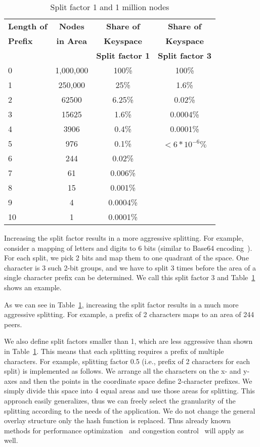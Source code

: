 \documentclass[fleqn,12pt,twoside]{article}
\begin{document}
\begin{table}[!tb]
  \centering
  \begin{tabular}{|l|c|c|c|}
    \hline
    \textbf{Length of}	& \textbf{Nodes} 	 & \textbf{Share of}	& \textbf{Share of}	\\	
    \textbf{Prefix}	& \textbf{in Area} 	 & \textbf{Keyspace}    & \textbf{Keyspace}\\
    		   	&		      	 & \textbf{Split factor 1} &\textbf{Split factor 3}\\
    \hline
    0 & 1,000,000 & 100\%	&100\%\\
    1 & 250,000	  & 25\%	&1.6\%\\
    2 & 62500	  & 6.25\%	&0.02\%\\
    3 & 15625 	  & 1.6\%	&0.0004\%\\
    4 & 3906	  & 0.4\%       &0.0001\%\\ 
    5 &	976	  & 0.1\%	&$<6*10^{-6}\%$\\
    6 &	244	  & 0.02\%&\\
    7 &	61	  & 0.006\%&\\
    8 &	15        & 0.001\%&\\
    9 &	4	  & 0.0004\%&\\
    10&	1	  & 0.0001\%&\\
    \hline
  \end{tabular}
  \caption{Split factor 1 and 1 million nodes}
  \label{tab:quad-tree-f1}
  \vskip -3mm
\end{table}

Increasing the split factor results in a more aggressive splitting.
For example, consider a mapping of letters and digits to 6 bits
(similar to Base64 encoding~\cite{RFC2045}). For each split, we pick 2
bits and map them to one quadrant of the space. One character is 3
such 2-bit groups, and we have to split 3 times before the area of a
single character prefix can be determined. We call this split 
factor 3 and Table~\ref{tab:quad-tree-f1} shows an example.




As we can see in Table~\ref{tab:quad-tree-f1}, increasing the split
factor results in a much more aggressive splitting. For example, a
prefix of 2 characters maps to an area of 244 peers.

We also define split factors smaller than 1, which are less
aggressive than shown in Table~\ref{tab:quad-tree-f1}. This means that
each splitting requires a prefix of multiple characters. For example,
splitting factor 0.5 (i.e., prefix of 2 characters for each split) is
implemented as follows. We arrange all the characters on the x- and
y-axes and then the points in the coordinate space define 2-character
prefixes. We simply divide this space into 4 equal areas and use those
areas for splitting. This approach easily generalizes, thus we can
freely select the granularity of the splitting according to the needs
of the application. We do not change the general overlay structure only the hash function is replaced. 
Thus already known methods for performance optimization~\cite{dabek2004ddl} and 
congestion control~\cite{klemm2006ccd} will apply as well.
\end{document}
